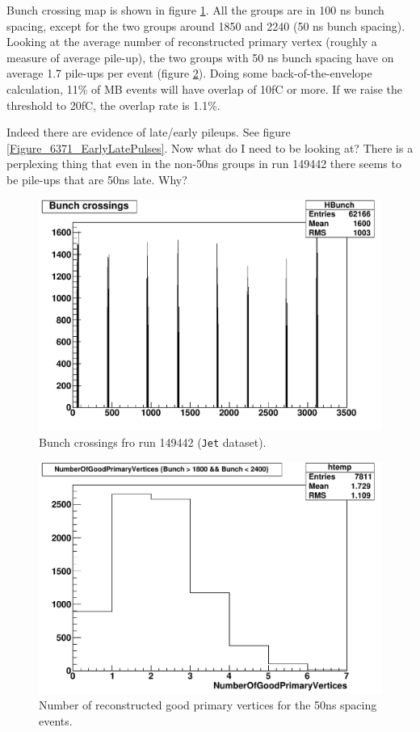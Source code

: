 
Bunch crossing map is shown in figure \ref{Figure_6371_149442_BunchCrossings}.
All the groups are in 100 ns bunch spacing, except for the two groups around 1850 and 2240 (50 ns bunch spacing).
Looking at the average number of reconstructed primary vertex (roughly a measure of average pile-up),
the two groups with 50 ns bunch spacing have on average 1.7 pile-ups per event (figure \ref{Figure_6371_Run149442_50nsGroups_NumberOfGoodPrimaryVertices}).
Doing some back-of-the-envelope calculation, 11\% of MB events will have overlap of 10fC or more.
If we raise the threshold to 20fC, the overlap rate is 1.1\%.

Indeed there are evidence of late/early pileups.  See figure \ref{Figure_6371_EarlyLatePulses}.  Now what do I need to be looking at?
There is a perplexing thing that even in the non-50ns groups in run 149442 there seems to be pile-ups that are 50ns late.  Why?

\begin{figure}[htbp]
   \includegraphics[width=120mm]{DailyLog/6371/6371_Run149442_Bunch}
   \caption{Bunch crossings fro run 149442 (\texttt{Jet} dataset).}
   \label{Figure_6371_149442_BunchCrossings}
\end{figure}

\begin{figure}[htbp]
   \includegraphics[width=120mm]{DailyLog/6371/6371_Run149442_50nsGroups_NumberOfGoodPrimaryVertices}
   \caption{Number of reconstructed good primary vertices for the 50ns spacing events.}
   \label{Figure_6371_Run149442_50nsGroups_NumberOfGoodPrimaryVertices}
\end{figure}

